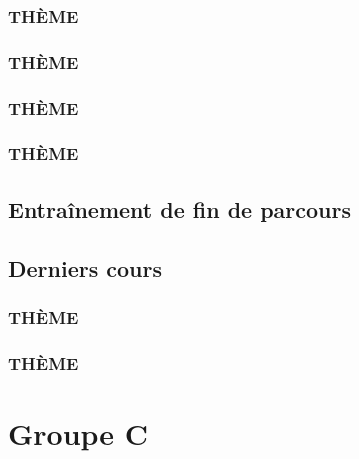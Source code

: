 \documentclass[poly,trombi]{valbonne}
\begin{document}

\subsection{THÈME}


\subsection{THÈME}


\subsection{THÈME}


\subsection{THÈME}






\section{Entraînement de fin de parcours}







\section{Derniers cours}

\subsection{THÈME}


\subsection{THÈME}


\chapter{Groupe C}
\end{document}
